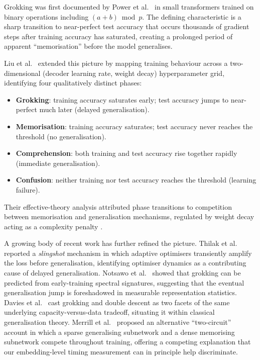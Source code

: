 \documentclass[12pt,openany,a4paper]{book}
\begin{document}
Grokking was first documented by Power et al.\ \cite{power2022grokking}
in small transformers trained on binary operations including
$(a+b)\bmod p$.
The defining characteristic is a sharp transition to near-perfect test
accuracy that occurs thousands of gradient steps after training
accuracy has saturated, creating a prolonged period of apparent
``memorisation'' before the model generalises.

Liu et al.\ \cite{liu2022towards} extended this picture by mapping
training behaviour across a two-dimensional (decoder learning rate,
weight decay) hyperparameter grid, identifying four qualitatively
distinct phases:
\begin{itemize}
  \item \textbf{Grokking}: training accuracy saturates early; test
    accuracy jumps to near-perfect much later (delayed generalisation).
  \item \textbf{Memorisation}: training accuracy saturates; test
    accuracy never reaches the threshold (no generalisation).
  \item \textbf{Comprehension}: both training and test accuracy rise
    together rapidly (immediate generalisation).
  \item \textbf{Confusion}: neither training nor test accuracy reaches
    the threshold (learning failure).
\end{itemize}
Their effective-theory analysis attributed phase transitions to
competition between memorisation and generalisation mechanisms,
regulated by weight decay acting as a complexity penalty
\cite{krogh1991weightdecay}.

A growing body of recent work has further refined the picture.
Thilak et al.\ \cite{thilak2022slingshot} reported a
\emph{slingshot} mechanism in which adaptive optimisers transiently
amplify the loss before generalisation, identifying optimiser
dynamics as a contributing cause of delayed generalisation.
Notsawo et al.\ \cite{notsawo2023predicting} showed that grokking can
be predicted from early-training spectral signatures, suggesting that
the eventual generalisation jump is foreshadowed in measurable
representation statistics.
Davies et al.\ \cite{davies2023unifying} cast grokking and double
descent as two facets of the same underlying capacity-versus-data
tradeoff, situating it within classical generalisation theory.
Merrill et al.\ \cite{merrill2023tale} proposed an alternative
``two-circuit'' account in which a sparse generalising subnetwork and
a dense memorising subnetwork compete throughout training, offering
a competing explanation that our embedding-level timing measurement
can in principle help discriminate.
\end{document}
